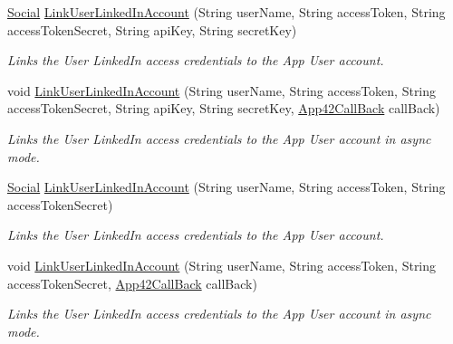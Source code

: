 \begin{DoxyCompactItemize}
\hyperlink{classcom_1_1shephertz_1_1app42_1_1paas_1_1sdk_1_1csharp_1_1social_1_1_social}{Social} \hyperlink{classcom_1_1shephertz_1_1app42_1_1paas_1_1sdk_1_1csharp_1_1social_1_1_social_service_a877e17947d85839ecf0ff287d2c00052}{Link\+User\+Linked\+In\+Account} (String user\+Name, String access\+Token, String access\+Token\+Secret, String api\+Key, String secret\+Key)
\begin{DoxyCompactList}\small\item\em Links the User Linked\+In access credentials to the App User account. \end{DoxyCompactList}\item 
void \hyperlink{classcom_1_1shephertz_1_1app42_1_1paas_1_1sdk_1_1csharp_1_1social_1_1_social_service_a9f3d88eab1889dde1130ec51a6854b9e}{Link\+User\+Linked\+In\+Account} (String user\+Name, String access\+Token, String access\+Token\+Secret, String api\+Key, String secret\+Key, \hyperlink{interfacecom_1_1shephertz_1_1app42_1_1paas_1_1sdk_1_1csharp_1_1_app42_call_back}{App42\+Call\+Back} call\+Back)
\begin{DoxyCompactList}\small\item\em Links the User Linked\+In access credentials to the App User account in async mode. \end{DoxyCompactList}\item 
\hyperlink{classcom_1_1shephertz_1_1app42_1_1paas_1_1sdk_1_1csharp_1_1social_1_1_social}{Social} \hyperlink{classcom_1_1shephertz_1_1app42_1_1paas_1_1sdk_1_1csharp_1_1social_1_1_social_service_ad9ff702811f4723f01f28f09a232db76}{Link\+User\+Linked\+In\+Account} (String user\+Name, String access\+Token, String access\+Token\+Secret)
\begin{DoxyCompactList}\small\item\em Links the User Linked\+In access credentials to the App User account. \end{DoxyCompactList}\item 
void \hyperlink{classcom_1_1shephertz_1_1app42_1_1paas_1_1sdk_1_1csharp_1_1social_1_1_social_service_a1907bd7823a5c757b63836c0790d210c}{Link\+User\+Linked\+In\+Account} (String user\+Name, String access\+Token, String access\+Token\+Secret, \hyperlink{interfacecom_1_1shephertz_1_1app42_1_1paas_1_1sdk_1_1csharp_1_1_app42_call_back}{App42\+Call\+Back} call\+Back)
\begin{DoxyCompactList}\small\item\em Links the User Linked\+In access credentials to the App User account in async mode. \end{DoxyCompactList}\item 

\end{DoxyCompactItemize}
